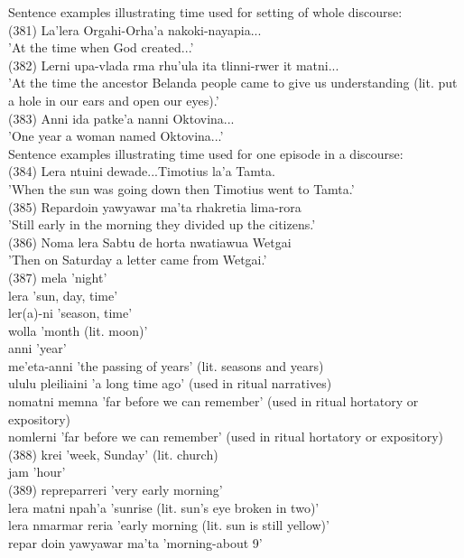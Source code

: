 \documentclass[10pt]{article}
\begin{document}
Sentence examples illustrating time used for setting of whole discourse:\\
(381) La'lera Orgahi-Orha'a nakoki-nayapia...\\
'At the time when God created...'\\
(382) Lerni upa-vlada rma rhu'ula ita tlinni-rwer it matni...\\
'At the time the ancestor Belanda people came to give us understanding (lit. put a hole in our ears and open our eyes).'\\
(383) Anni ida patke'a nanni Oktovina...\\
'One year a woman named Oktovina...'\\
Sentence examples illustrating time used for one episode in a discourse:\\
(384) Lera ntuini dewade...Timotius la'a Tamta.\\
'When the sun was going down then Timotius went to Tamta.'\\
(385) Repardoin yawyawar ma'ta rhakretia lima-rora\\
'Still early in the morning they divided up the citizens.'\\
(386) Noma lera Sabtu de horta nwatiawua Wetgai\\
'Then on Saturday a letter came from Wetgai.'\\
(387) mela 'night'\\
lera 'sun, day, time'\\
ler(a)-ni 'season, time'\\
wolla 'month (lit. moon)'\\
anni 'year'\\
me'eta-anni 'the passing of years' (lit. seasons and years)\\
ululu pleiliaini 'a long time ago' (used in ritual narratives)\\
nomatni memna 'far before we can remember' (used in ritual hortatory or expository)\\
nomlerni 'far before we can remember' (used in ritual hortatory or expository)\\
(388) krei 'week, Sunday' (lit. church)\\
jam 'hour'\\
(389) repreparreri 'very early morning'\\
lera matni npah'a 'sunrise (lit. sun's eye broken in two)'\\
lera nmarmar reria 'early morning (lit. sun is still yellow)'\\
repar doin yawyawar ma'ta 'morning-about 9'\\
\end{document}
